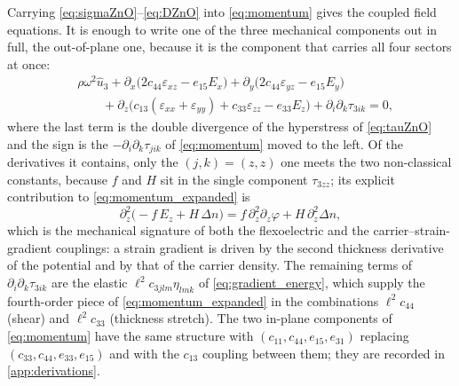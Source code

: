 Carrying \eqref{eq:sigmaZnO}--\eqref{eq:DZnO} into \eqref{eq:momentum} gives
the coupled field equations.  It is enough to write one of the three mechanical
components out in full, the out-of-plane one, because it is the component that
carries all four sectors at once:
\begin{equation}
\label{eq:momentum_expanded}
\begin{aligned}
&\rho\omega^{2}\widehat u_3
+\partial_x\bigl(2c_{44}\varepsilon_{xz}-e_{15}E_x\bigr)
+\partial_y\bigl(2c_{44}\varepsilon_{yz}-e_{15}E_y\bigr)\\
&\qquad
+\partial_z\bigl(c_{13}(\varepsilon_{xx}+\varepsilon_{yy})
+c_{33}\varepsilon_{zz}-e_{33}E_z\bigr)
+\partial_i\partial_k\tau_{3ik}=0 ,
\end{aligned}
\end{equation}
where the last term is the double divergence of the hyperstress of
\eqref{eq:tauZnO} and the sign is the $-\partial_i\partial_k\tau_{jik}$ of
\eqref{eq:momentum} moved to the left.  Of the derivatives it contains, only the
$(j,k)=(z,z)$ one meets the two non-classical constants, because $f$ and $H$ sit
in the single component $\tau_{3zz}$; its explicit contribution to
\eqref{eq:momentum_expanded} is
\begin{equation}
\label{eq:Hterm}
\partial_z^{2}\bigl(-f\,E_z+H\,\Delta n\bigr)
= f\,\partial_z^{2}\partial_z\varphi+H\,\partial_z^{2}\Delta n ,
\end{equation}
which is the mechanical signature of both the flexoelectric and the
carrier--strain-gradient couplings: a strain gradient is driven by the second
thickness derivative of the potential and by that of the carrier density.  The
remaining terms of $\partial_i\partial_k\tau_{3ik}$ are the elastic
$\ell^{2}c_{3jlm}\eta_{lmk}$ of \eqref{eq:gradient_energy}, which supply the
fourth-order piece of \eqref{eq:momentum_expanded} in the combinations
$\ell^{2}c_{44}$ (shear) and $\ell^{2}c_{33}$ (thickness stretch).  The two
in-plane components of \eqref{eq:momentum} have the same structure with
$(c_{11},c_{44},e_{15},e_{31})$ replacing $(c_{33},c_{44},e_{33},e_{15})$ and
with the $c_{13}$ coupling between them; they are recorded in
\cref{app:derivations}.

